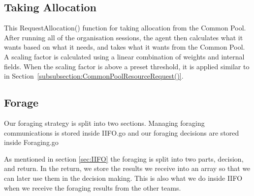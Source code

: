 \subsection{Taking Allocation}
This RequestAllocation() function for taking allocation from the Common Pool. After running all of the organisation sessions, the agent then calculates what it wants based on what it needs, and takes what it wants from the Common Pool. A scaling factor is calculated using a linear combination of weights and internal fields. When the scaling factor is above a preset threshold, it is applied similar to in Section~\ref{subsubsection:CommonPoolResourceRequest()}.  %

\subsection{Forage}
Our foraging strategy is split into two sections. Managing foraging communications is stored inside IIFO.go and our foraging decisions are stored inside Foraging.go

As mentioned in section \ref{sec:IIFO} %
the foraging is split into two parts, decision, and return. In the return, we store the results we receive into an array so that we can later use them in the decision making. This is also what we do inside IIFO when we receive the foraging results from the other teams. 

